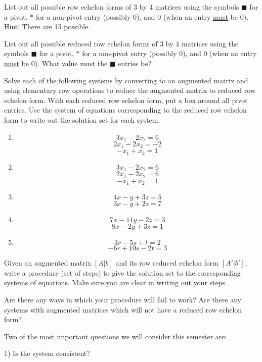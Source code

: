 \begin{question}\label{q5} List out all possible row echelon forms of 3 by 4 matrices using the symbols $\blacksquare$ for a pivot, $*$ for a non-pivot entry (possibly $0$), and $0$ (when an entry \underline{must} be $0$). Hint: There are 15 possible.
\end{question}

\begin{question} List out all possible reduced row echelon forms of 3 by 4 matrices using the symbols $\blacksquare$ for a pivot, $*$ for a non-pivot entry (possibly $0$), and $0$ (when an entry \underline{must} be $0$). What value must the $\blacksquare$ entries be?
\end{question}

\begin{question}\label{q3} Solve each of the following systems by converting to an augmented matrix and using elementary row operations to reduce the augmented matrix to reduced row echelon form. With each reduced row echelon form, put a box around all pivot entries. Use the system of equations corresponding to the reduced row echelon form to write out the solution set for each system.
\begin{enumerate}
\item  $$ 3x_1-2x_2=6$$
$$ 2x_1-2x_2=-2 $$
$$-x_1+x_2=1 $$
\item  $$ 3x_1-2x_2=6$$
$$ 2x_1-2x_2=6 $$
$$-x_1+x_2=1 $$
\item  $$4x-y+3z=5$$
$$3x-y+2z=7$$
\item  $$7x-11y-2z=3$$
$$8x-2y+3z=1$$
\item  $$3r-5s+t=2$$
$$-6r+10s-2t=3$$
\end{enumerate}
\end{question}
\begin{question}
Given an augmented matrix $[A|b]$ and its row reduced echelon form $[A'|b']$, write a procedure (set of steps) to give the solution set to the corresponding systems of equations. Make sure you are clear in writing out your steps.

Are there any ways in which your procedure will fail to work? Are there any systems with augmented matrices which will not have a reduced row echelon form?
\end{question}



Two of the most important questions we will consider this semester are:

1) Is the system consistent?


